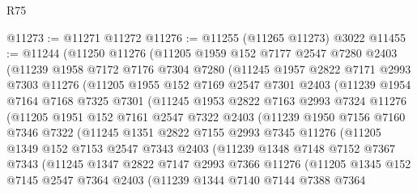 \begin{lexlean}{R75}
\begin{coremodule}
@11273 := @11271 @11272
@11276 := @11255 (@11265 @11273) @3022
@11455 := @11244
    (@11250
      @11276
      (@11205
        @1959
        @152
        @7177
        @2547
        @7280
        @2403
        (@11239
          @1958
          @7172
          @7176
          @7304
          @7280
          (@11245
            @1957
            @2822
            @7171
            @2993
            @7303
            @11276
            (@11205
              @1955
              @152
              @7169
              @2547
              @7301
              @2403
              (@11239
                @1954
                @7164
                @7168
                @7325
                @7301
                (@11245
                  @1953
                  @2822
                  @7163
                  @2993
                  @7324
                  @11276
                  (@11205
                    @1951
                    @152
                    @7161
                    @2547
                    @7322
                    @2403
                    (@11239
                      @1950
                      @7156
                      @7160
                      @7346
                      @7322
                      (@11245
                        @1351
                        @2822
                        @7155
                        @2993
                        @7345
                        @11276
                        (@11205
                          @1349
                          @152
                          @7153
                          @2547
                          @7343
                          @2403
                          (@11239
                            @1348
                            @7148
                            @7152
                            @7367
                            @7343
                            (@11245
                              @1347
                              @2822
                              @7147
                              @2993
                              @7366
                              @11276
                              (@11205
                                @1345
                                @152
                                @7145
                                @2547
                                @7364
                                @2403
                                (@11239
                                  @1344
                                  @7140
                                  @7144
                                  @7388
                                  @7364

\end{coremodule}
\end{lexlean}
